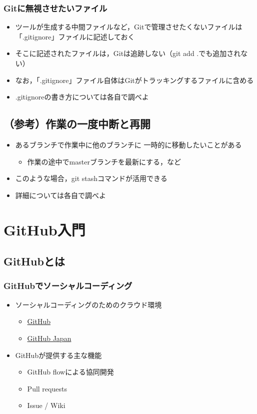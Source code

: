 \documentclass[a4paper,twoside,twocolumn]{bxjsarticle}
\begin{document}
\subsubsection{Gitに無視させたいファイル}
\label{sec-1-8-2}
\begin{itemize}
\item ツールが生成する中間ファイルなど，Gitで管理させたくないファイルは
「.gitignore」ファイルに記述しておく
\item そこに記述されたファイルは，Gitは追跡しない（git add .でも追加されない）
\item なお，「.gitignore」ファイル自体はGitがトラッキングするファイルに含める
\item .gitignoreの書き方については各自で調べよ
\end{itemize}

\subsection{（参考）作業の一度中断と再開}
\label{sec-1-9}
\begin{itemize}
\item あるブランチで作業中に他のブランチに
一時的に移動したいことがある
\begin{itemize}
\item 作業の途中でmasterブランチを最新にする，など
\end{itemize}
\item このような場合，git stashコマンドが活用できる
\item 詳細については各自で調べよ
\end{itemize}
\section{GitHub入門}
\label{sec-2}
\subsection{GitHubとは}
\label{sec-2-1}
\subsubsection{GitHubでソーシャルコーディング}
\label{sec-2-1-1}
\begin{itemize}
\item ソーシャルコーディングのためのクラウド環境
\begin{itemize}
\item \href{https://github.com/}{GitHub}
\item \href{http://github.co.jp/}{GitHub Japan}
\end{itemize}
\item GitHubが提供する主な機能
\begin{itemize}
\item GitHub flowによる協同開発
\item Pull requests
\item Issue / Wiki
\end{itemize}
\end{itemize}
\end{document}
